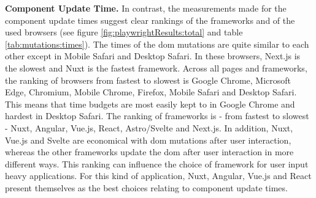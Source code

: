 \documentclass[a4paper, 12pt]{article}
\begin{document}
\textbf{Component Update Time.} In contrast, the measurements made for the component update times suggest clear rankings of the frameworks and of the used browsers (see figure \ref{fig:playwrightResults:total} and table \ref{tab:mutations:times}).
The times of the \acrshort{dom} mutations are quite similar to each other except in Mobile Safari and Desktop Safari.
In these browsers, Next.js is the slowest and Nuxt is the fastest framework.
Across all pages and frameworks, the ranking of browsers from fastest to slowest is Google Chrome, Microsoft Edge, Chromium, Mobile Chrome, Firefox, Mobile Safari and Desktop Safari.
This means that time budgets are most easily kept to in Google Chrome and hardest in Desktop Safari.
The ranking of frameworks is - from fastest to slowest - Nuxt, Angular, Vue.js, React, Astro/Svelte and Next.js.
In addition, Nuxt, Vue.js and Svelte are economical with \acrshort{dom} mutations after user interaction, whereas the other frameworks update the \acrshort{dom} after user interaction in more different ways.
This ranking can influence the choice of framework for user input heavy applications.
For this kind of application, Nuxt, Angular, Vue.js and React present themselves as the best choices relating to component update times.
\end{document}
